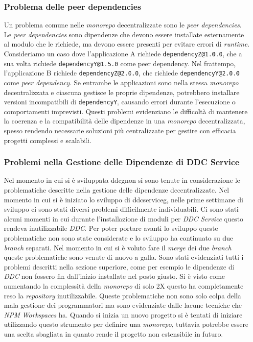 \subsubsection{Problema delle peer dependencies}

Un problema comune nelle \textit{monorepo} decentralizzate sono le \textit{peer dependencies}. 
Le \textit{peer dependencies} sono dipendenze che devono essere installate esternamente al modulo che le richiede, ma devono essere presenti per evitare errori di \textit{runtime}.
Consideriamo un caso dove l'applicazione A richiede \texttt{dependencyZ@1.0.0}, che a sua volta richiede \texttt{dependencyY@1.5.0} come peer dependency.
Nel frattempo, l'applicazione B richiede \texttt{dependencyZ@2.0.0}, che richiede \texttt{dependencyY@2.0.0} come \textit{peer dependency}.
Se entrambe le applicazioni sono nella stessa \textit{monorepo} decentralizzata e ciascuna gestisce le proprie dipendenze, potrebbero installare versioni incompatibili di \texttt{dependencyY}, causando errori durante l'esecuzione o comportamenti imprevisti.
Questi problemi evidenziano le difficoltà di mantenere la coerenza e la compatibilità delle dipendenze in una \textit{monorepo} decentralizzata, spesso rendendo necessarie soluzioni più centralizzate per gestire con efficacia progetti complessi e scalabili.

\subsubsection{Problemi nella Gestione delle Dipendenze di DDC Service}
Nel momento in cui si è sviluppata \gls{ddcg}\glox non si sono tenute in considerazione le problematiche descritte nella gestione delle dipendenze decentralizzate.
Nel momento in cui si è iniziato lo sviluppo di \gls{ddcserviceg}\glox, nelle prime settimane di sviluppo ci sono stati diversi problemi difficilmente individuabili.
Ci sono stati alcuni momenti in cui durante l'installazione di moduli per \textit{DDC Service} questo rendeva inutilizzabile \textit{DDC}.
Per poter portare avanti lo sviluppo queste problematiche non sono state considerate e lo sviluppo ha continuato su due \textit{branch} separati.
Nel momento in cui si è voluto fare il \textit{merge} dei due \textit{branch} queste problematiche sono venute di nuovo a galla.
Sono stati evidenziati tutti i problemi descritti nella sezione superiore, come per esempio le dipendenze di \textit{DDC} non fossero fin dall'inizio installate nel posto giusto.
Si è visto come aumentando la complessità della \textit{monorepo} di solo 2X questo ha completamente reso la \textit{repository} inutilizzabile.
Queste problematiche non sono solo colpa della mala gestione dei programmatori ma sono evidenziate dalle lacune tecniche che \textit{NPM Workspaces} ha.
Quando si inizia un nuovo progetto si è tentati di iniziare utilizzando questo strumento per definire una \textit{monorepo}, tuttavia potrebbe essere una scelta sbagliata in quanto rende il progetto non estensibile in futuro.


